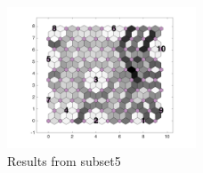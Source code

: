 \begin{figure}
        \centering
        \includegraphics[width=0.5\textwidth]{../../images0.01/M31/2D/image_subsets/subset5_dist_with_hits_t.png}
    \caption{Results from subset5}
    \label{fig: subset5}
\end{figure}